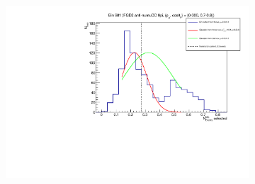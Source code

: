 \begin{figure}[h]
	\begin{subfigure}[t]{0.32\textwidth}
		\includegraphics[width=\textwidth,page=1, trim={0mm 0mm 0mm 0mm}, clip]{figures/det/fgd2_numubar_0pi_bad}
	\end{subfigure}


\end{figure}
